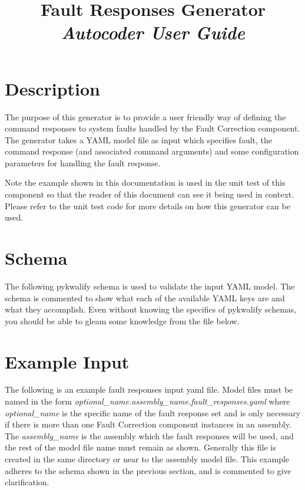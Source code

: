 



\title{\textbf{Fault Responses Generator} \\
\large\textit{Autocoder User Guide}}
\date{}
\maketitle

\section{Description}

The purpose of this generator is to provide a user friendly way of defining the command responses to system faults handled by the Fault Correction component. The generator takes a YAML model file as input which specifies fault, the command response (and associated command arguments) and some configuration parameters for handling the fault response.

Note the example shown in this documentation is used in the unit test of this component so that the reader of this document can see it being used in context. Please refer to the unit test code for more details on how this generator can be used.

\section{Schema}

The following pykwalify schema is used to validate the input YAML model. The schema is commented to show what each of the available YAML keys are and what they accomplish. Even without knowing the specifics of pykwalify schemas, you should be able to gleam some knowledge from the file below.


\section{Example Input}

The following is an example fault responses input yaml file. Model files must be named in the form \textit{optional\_name.assembly\_name.fault\_responses.yaml} where \textit{optional\_name} is the specific name of the fault response set and is only necessary if there is more than one Fault Correction component instances in an assembly. The \textit{assembly\_name} is the assembly which the fault responses will be used, and the rest of the model file name must remain as shown. Generally this file is created in the same directory or near to the assembly model file. This example adheres to the schema shown in the previous section, and is commented to give clarification.

